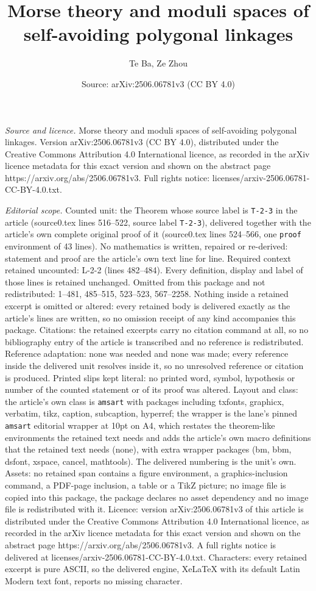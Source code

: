 \documentclass[10pt,a4paper]{amsart}
\title[Morse theory and moduli spaces of self-avoiding polygonal li]{Morse theory and moduli spaces of self-avoiding polygonal linkages}
\author{Te Ba, Ze Zhou}
\date{Source: arXiv:2506.06781v3 (CC BY 4.0)}
\begin{document}
\maketitle

\noindent\emph{Source and licence.} Morse theory and moduli spaces of self-avoiding polygonal linkages. Version arXiv:2506.06781v3 (CC BY 4.0), distributed under the Creative Commons Attribution 4.0 International licence, as recorded in the arXiv licence metadata for this exact version and shown on the abstract page https://arxiv.org/abs/2506.06781v3. Full rights notice: licenses/arxiv-2506.06781-CC-BY-4.0.txt.\par\smallskip

\noindent\textit{Editorial scope.} Counted unit: the Theorem whose source label is \texttt{T-2-3} in the article (source0.tex lines 516--522, source label \texttt{T-2-3}), delivered together with the article's own complete original proof of it (source0.tex lines 524--566, one \texttt{proof} environment of 43 lines). No mathematics is written, repaired or re-derived: statement and proof are the article's own text line for line. Required context retained uncounted: L-2-2 (lines 482--484). Every definition, display and label of those lines is retained unchanged. Omitted from this package and not redistributed: 1--481, 485--515, 523--523, 567--2258. Nothing inside a retained excerpt is omitted or altered: every retained body is delivered exactly as the article's lines are written, so no omission receipt of any kind accompanies this package. Citations: the retained excerpts carry no citation command at all, so no bibliography entry of the article is transcribed and no reference is redistributed. Reference adaptation: none was needed and none was made; every reference inside the delivered unit resolves inside it, so no unresolved reference or citation is produced. Printed slips kept literal: no printed word, symbol, hypothesis or number of the counted statement or of its proof was altered. Layout and class: the article's own class is \texttt{amsart} with packages including txfonts, graphicx, verbatim, tikz, caption, subcaption, hyperref; the wrapper is the lane's pinned \texttt{amsart} editorial wrapper at 10pt on A4, which restates the theorem-like environments the retained text needs and adds the article's own macro definitions that the retained text needs (none), with extra wrapper packages (bm, bbm, dsfont, xspace, cancel, mathtools). The delivered numbering is the unit's own. Assets: no retained span contains a figure environment, a graphics-inclusion command, a PDF-page inclusion, a table or a TikZ picture; no image file is copied into this package, the package declares no asset dependency and no image file is redistributed with it. Licence: version arXiv:2506.06781v3 of this article is distributed under the Creative Commons Attribution 4.0 International licence, as recorded in the arXiv licence metadata for this exact version and shown on the abstract page https://arxiv.org/abs/2506.06781v3. A full rights notice is delivered at licenses/arxiv-2506.06781-CC-BY-4.0.txt. Characters: every retained excerpt is pure ASCII, so the delivered engine, XeLaTeX with its default Latin Modern text font, reports no missing character.
\end{document}
